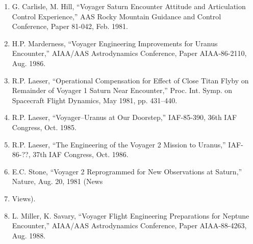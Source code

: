 \documentclass[12pt]{article}
\begin{document}
\begin{enumerate}
\item G. Carlisle, M. Hill, ``Voyager Saturn Encounter Attitude and Articulation Control Experience,'' AAS Rocky Mountain Guidance and Control Conference, Paper 81-042, Feb. 1981.
\item H.P. Marderness, ``Voyager Engineering Improvements for Uranus Encounter,'' AIAA/AAS Astrodynamics Conference, Paper AIAA-86-2110, Aug. 1986.
\item R.P. Laeser, ``Operational Compensation for Effect of Close Titan Flyby on Remainder of Voyager 1 Saturn Near Encounter,'' Proc. Int. Symp. on Spacecraft Flight Dynamics, May 1981, pp. 431--440.
\item R.P. Laeser, ``Voyager--Uranus at Our Doorstep,'' IAF-85-390, 36th IAF Congress, Oct. 1985.
\item R.P. Laeser, ``The Engineering of the Voyager 2 Mission to Uranus,'' IAF-86-??, 37th IAF Congress, Oct. 1986.
\item E.C. Stone, ``Voyager 2 Reprogrammed for New Observations at Saturn,'' Nature, Aug. 20, 1981 (News
\item Views).
\item L. Miller, K. Savary, ``Voyager Flight Engineering Preparations for Neptune Encounter,'' AIAA/AAS Astrodynamics Conference, Paper AIAA-88-4263, Aug. 1988.
\end{enumerate}
\end{document}
